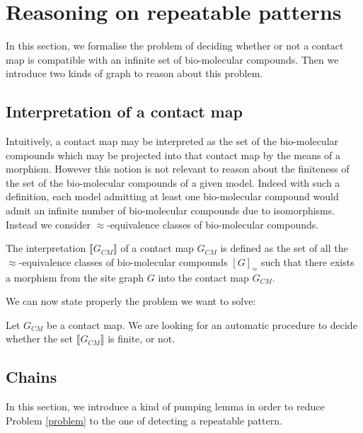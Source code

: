 \documentclass{entcs}
\newcommand{\graphsymb}{G}
\newcommand{\iso}{\approx}
\begin{document}
\section{Reasoning on repeatable patterns}
\label{sec:graphs}

In this section, we formalise the problem of deciding whether or not a contact map is compatible with an infinite set of bio-molecular compounds. Then we introduce two kinds of graph to reason about this problem.

\subsection{Interpretation of a contact map}

Intuitively, a contact map may be interpreted as the set of the bio-molecular compounds which may be projected into that contact map by the means of a morphism. However this notion is not relevant to reason about the finiteness of the set of the bio-molecular compounds of a given model. Indeed with such a  definition,  each model admitting at least one bio-molecular compound would admit an infinite number of bio-molecular compounds due to isomorphisms. Instead we consider $\iso$-equivalence classes of bio-molecular compounds.


\begin{defn}
The interpretation $\llbracket \graphsymb_{\textit{CM}} \rrbracket$ of a contact map $\graphsymb_{\textit{CM}}$ is defined as the set of all the $\iso$-equivalence classes of bio-molecular compounds $[G]_{\iso}$ such that there exists a morphism from the site graph $G$ into the contact map $\graphsymb_{\textit{CM}}$.
\end{defn}

We can now state properly the problem we want to solve:
\begin{problem}\label{problem}
Let $\graphsymb_{\textit{CM}}$ be a contact map.
We are looking for an automatic procedure to decide whether
the set $\llbracket \graphsymb_{\textit{CM}} \rrbracket$ is finite, or not.
\end{problem}

\subsection{Chains}

In this section, we introduce a kind of pumping lemma in order to reduce
Problem \ref{problem} to the one of detecting a repeatable pattern.
\end{document}
